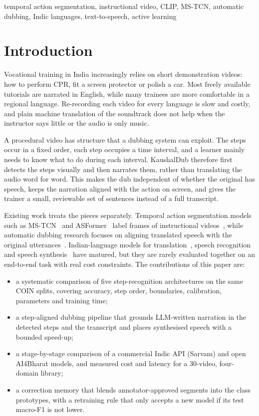 \documentclass[conference]{IEEEtran}
\begin{document}
\begin{IEEEkeywords}
temporal action segmentation, instructional video, CLIP, MS-TCN, automatic dubbing, Indic languages, text-to-speech,
active learning
\end{IEEEkeywords}

\section{Introduction}
Vocational training in India increasingly relies on short demonstration videos: how to perform CPR, fit a screen
protector or polish a car. Most freely available tutorials are narrated in English, while many trainees are more
comfortable in a regional language. Re-recording each video for every language is slow and costly, and plain machine
translation of the soundtrack does not help when the instructor says little or the audio is only music.

A procedural video has structure that a dubbing system can exploit. The steps occur in a fixed order, each step occupies
a time interval, and a learner mainly needs to know what to do during each interval. KaushalDub therefore first detects
the steps visually and then narrates them, rather than translating the audio word for word. This makes the dub
independent of whether the original has speech, keeps the narration aligned with the action on screen, and gives the
trainer a small, reviewable set of sentences instead of a full transcript.

Existing work treats the pieces separately. Temporal action segmentation models such as MS-TCN~\cite{farha2019mstcn} and
ASFormer~\cite{yi2021asformer} label frames of instructional videos~\cite{tang2019coin,zhukov2019crosstask}, while
automatic dubbing research focuses on aligning translated speech with the original utterances~\cite{federico2020dubbing,
oktem2019prosodic}. Indian-language models for translation~\cite{gala2023indictrans2}, speech
recognition~\cite{bhogale2023vistaar} and speech synthesis~\cite{lyth2024parler} have matured, but they are rarely
evaluated together on an end-to-end task with real cost constraints. The contributions of this paper are:
\begin{itemize}
\item a systematic comparison of five step-recognition architectures on the same COIN splits, covering accuracy, step
order, boundaries, calibration, parameters and training time;
\item a step-aligned dubbing pipeline that grounds LLM-written narration in the detected steps and the transcript and
places synthesised speech with a bounded speed-up;
\item a stage-by-stage comparison of a commercial Indic API (Sarvam) and open AI4Bharat models, and measured cost and
latency for a 30-video, four-domain library;
\item a correction memory that blends annotator-approved segments into the class prototypes, with a retraining rule that
only accepts a new model if its test macro-F1 is not lower.
\end{itemize}
\end{document}
